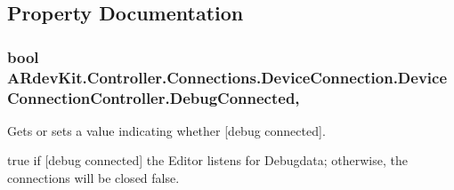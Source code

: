 \subsection{Property Documentation}
\hypertarget{class_a_rdev_kit_1_1_controller_1_1_connections_1_1_device_connection_1_1_device_connection_controller_a6e1f49d1912fccc6edc212acbfc74c05}{
\subsubsection[{Debug\-Connected}]{\setlength{\rightskip}{0pt plus 5cm}bool A\-Rdev\-Kit.\-Controller.\-Connections.\-Device\-Connection.\-Device\-Connection\-Controller.\-Debug\-Connected\hspace{0.3cm}{\ttfamily [get]}, {\ttfamily [set]}}}\label{class_a_rdev_kit_1_1_controller_1_1_connections_1_1_device_connection_1_1_device_connection_controller_a6e1f49d1912fccc6edc212acbfc74c05}


Gets or sets a value indicating whether \mbox{[}debug connected\mbox{]}. 

true if \mbox{[}debug connected\mbox{]} the Editor listens for Debugdata; otherwise, the connections will be closed false. 